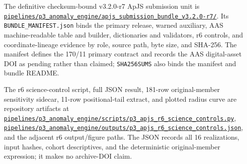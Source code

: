 \documentclass[twocolumn,linenumbers]{aastex702}
\newcommand{\repoBase}{https://github.com/Hubify-Projects/bigbounce/blob/main}
\newcommand{\artifact}[1]{\href{\repoBase/#1}{\nolinkurl{#1}}}
\newcommand{\bundleVersion}{v3.2.0-r7}
\begin{document}
The definitive checksum-bound \bundleVersion{} ApJS submission unit is
\href{https://github.com/Hubify-Projects/bigbounce/tree/main/pipelines/p3_anomaly_engine/apjs_submission_bundle_v3.2.0-r7}{\nolinkurl{pipelines/p3_anomaly_engine/apjs_submission_bundle_v3.2.0-r7/}}.
Its \texttt{BUNDLE\_MANIFEST.json} binds the primary release, warned auxiliary, AAS
machine-readable table and builder, dictionaries and validators, r6 controls, and coordinate-lineage
evidence by role, source path, byte size, and SHA-256.  The manifest defines the 170/11 primary
contract and records the AAS digital-asset DOI as pending rather than claimed; \texttt{SHA256SUMS}
also binds the manifest and bundle README.

The r6 science-control script, full JSON result, 181-row original-member sensitivity sidecar,
11-row positional-tail extract, and plotted radius curve are repository artifacts at
\artifact{pipelines/p3\_anomaly\_engine/scripts/p3\_apjs\_r6\_science\_controls.py},
\artifact{pipelines/p3\_anomaly\_engine/outputs/p3\_apjs\_r6\_science\_controls.json}, and the
adjacent r6 output/figure paths.  The JSON records all 16 realizations, input hashes, cohort
descriptives, and the deterministic original-member expression; it makes no archive-DOI claim.
\end{document}
